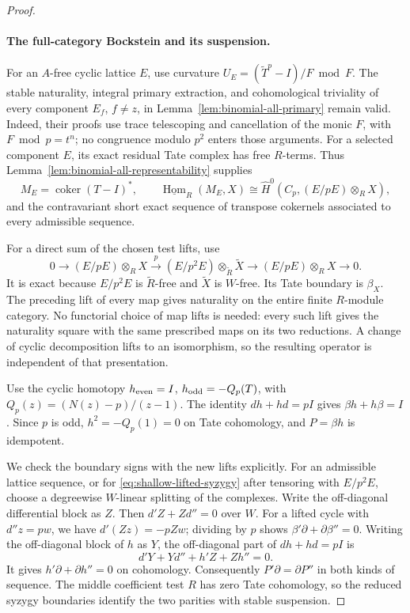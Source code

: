 \begin{proof}
\paragraph{The full-category Bockstein and its suspension.}
For an $A$-free cyclic lattice $E$, use curvature
$U_E=(\widetilde T^p-I)/F\bmod F$.
The stable naturality, integral primary extraction, and
cohomological triviality of every component $E_f$, $f\ne z$,
in Lemma~\ref{lem:binomial-all-primary} remain valid.
Indeed, their proofs use trace telescoping and cancellation
of the monic $F$, with $F\bmod p=t^n$; no congruence modulo
$p^2$ enters those arguments.
For a selected component $E$, its exact residual Tate
complex has free $R$-terms.  Thus
Lemma~\ref{lem:binomial-all-representability} supplies
\[
 M_E=\operatorname{coker}(T-I)^*,\qquad
 \underline{\operatorname{Hom}}_R(M_E,X)
 \cong\widehat H^0(C_p,(E/pE)\otimes_R X),
\]
and the contravariant short exact sequence of transpose
cokernels associated to every admissible sequence.

For a direct sum of the chosen test lifts, use
\[
 0\longrightarrow(E/pE)\otimes_R X
 \xrightarrow{p}(E/p^2E)\otimes_{\widetilde R}\widetilde X
 \longrightarrow(E/pE)\otimes_R X\longrightarrow0.
\]
It is exact because $E/p^2E$ is $\widetilde R$-free and
$\widetilde X$ is $W$-free.  Its Tate boundary is $\beta_X$.
The preceding lift of every map gives naturality on the
entire finite $R$-module category.  No functorial choice of
map lifts is needed: every such lift gives the naturality
square with the same prescribed maps on its two reductions.
A change of cyclic decomposition lifts to an isomorphism,
so the resulting operator is independent of that presentation.

Use the cyclic homotopy
$h_{\rm even}=I$, $h_{\rm odd}=-Q_p(T)$, with
$Q_p(z)=(N(z)-p)/(z-1)$.
The identity $dh+hd=pI$ gives $\beta h+h\beta=I$.
Since $p$ is odd, $h^2=-Q_p(1)=0$ on Tate cohomology, and
$P=\beta h$ is idempotent.

We check the boundary signs with the new lifts explicitly.
For an admissible lattice sequence, or for
\eqref{eq:shallow-lifted-syzygy} after tensoring with $E/p^2E$,
choose a degreewise $W$-linear splitting of the complexes.
Write the off-diagonal differential block as $Z$.
Then $d'Z+Zd''=0$ over $W$.
For a lifted cycle with $d''z=pw$, we have
$d'(Zz)=-pZw$; dividing by $p$ shows
$\beta'\partial+\partial\beta''=0$.
Writing the off-diagonal block of $h$ as $Y$, the off-diagonal
part of $dh+hd=pI$ is
\[
 d'Y+Yd''+h'Z+Zh''=0.
\]
It gives $h'\partial+\partial h''=0$ on cohomology.
Consequently $P'\partial=\partial P''$ in both kinds of
sequence.  The middle coefficient test $R$ has zero Tate
cohomology, so the reduced syzygy boundaries identify the
two parities with stable suspension.


\end{proof}
